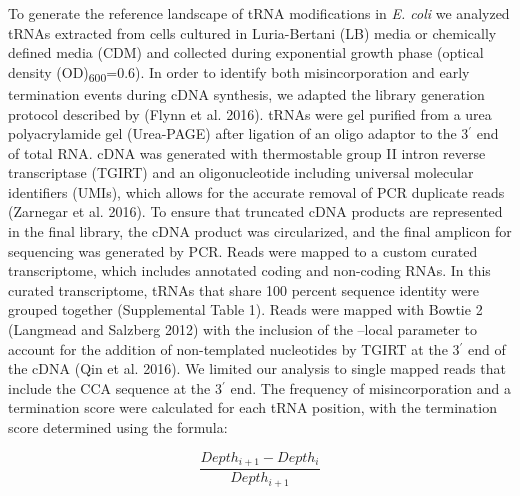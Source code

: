 \documentclass[times, twoside]{zHenriquesLab-StyleBioRxiv}
\begin{document}
To generate the reference landscape of tRNA modifications in \textit{E. coli} we analyzed tRNAs extracted from cells cultured in Luria-Bertani (LB) media or chemically defined media (CDM) and collected during exponential growth phase (optical density (OD)\textsubscript{600}=0.6). In order to identify both misincorporation and early termination events during cDNA synthesis, we adapted the library generation protocol described by (Flynn et al. 2016). tRNAs were gel purified from a urea polyacrylamide gel (Urea-PAGE) after ligation of an oligo adaptor to the 3\(^{\prime}\) end of total RNA. cDNA was generated with thermostable group II intron reverse transcriptase (TGIRT) and an oligonucleotide including universal molecular identifiers (UMIs), which allows for the accurate removal of PCR duplicate reads (Zarnegar et al. 2016). To ensure that truncated cDNA products are represented in the final library, the cDNA product was circularized, and the final amplicon for sequencing was generated by PCR. Reads were mapped to a custom curated transcriptome, which includes annotated coding and non-coding RNAs. In this curated transcriptome, tRNAs that share 100 percent sequence identity were grouped together (Supplemental Table 1). Reads were mapped with Bowtie 2 (Langmead and Salzberg 2012) with the inclusion of the --local parameter to account for the addition of non-templated nucleotides by TGIRT at the 3\(^{\prime}\) end of the cDNA (Qin et al. 2016). We limited our analysis to single mapped reads that include the CCA sequence at the 3\(^{\prime}\) end. The frequency of misincorporation and a termination score were calculated for each tRNA position, with the termination score determined using the formula: 

\begin{equation}
  \frac{Depth_{i+1}-Depth_{i}}{Depth_{i+1}}  
\end{equation}
\end{document}
